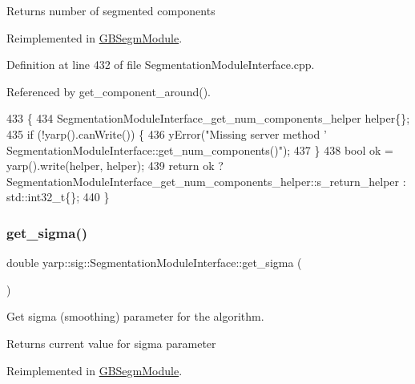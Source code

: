 \begin{DoxyReturn}{Returns}
number of segmented components 
\end{DoxyReturn}


Reimplemented in \hyperlink{classGBSegmModule_a655ee7c895eed07b07099133b9d8ce68}{G\+B\+Segm\+Module}.



Definition at line 432 of file Segmentation\+Module\+Interface.\+cpp.



Referenced by get\+\_\+component\+\_\+around().


\begin{DoxyCode}
433 \{
434     SegmentationModuleInterface\_get\_num\_components\_helper helper\{\};
435     \textcolor{keywordflow}{if} (!yarp().canWrite()) \{
436         yError(\textcolor{stringliteral}{"Missing server method '%
       SegmentationModuleInterface::get\_num\_components()"});
437     \}
438     \textcolor{keywordtype}{bool} ok = yarp().write(helper, helper);
439     \textcolor{keywordflow}{return} ok ? SegmentationModuleInterface\_get\_num\_components\_helper::s\_return\_helper : std::int32\_t\{\};
440 \}
\end{DoxyCode}
\mbox{\label{classyarp_1_1sig_1_1SegmentationModuleInterface_a38431f2c63d7da8ebf20adf0ed1da4fe}} 
\subsubsection{\texorpdfstring{get\+\_\+sigma()}{get\_sigma()}}
{\footnotesize\ttfamily double yarp\+::sig\+::\+Segmentation\+Module\+Interface\+::get\+\_\+sigma (\begin{DoxyParamCaption}{ }\end{DoxyParamCaption})\hspace{0.3cm}{\ttfamily [virtual]}}



Get sigma (smoothing) parameter for the algorithm. 

\begin{DoxyReturn}{Returns}
current value for sigma parameter 
\end{DoxyReturn}


Reimplemented in \hyperlink{classGBSegmModule_ae32ae1b1461e19c3a1b2f429c729ed03}{G\+B\+Segm\+Module}.



